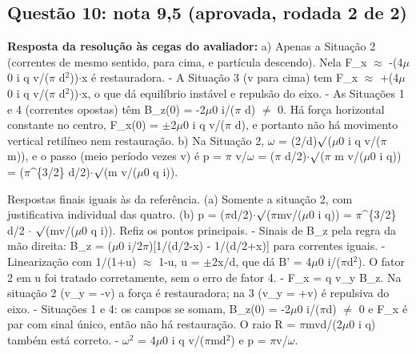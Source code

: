 \documentclass{article}%
\begin{document}
\subsection*{Questão 10: nota 9,5 (aprovada, rodada 2 de 2)}%
\textbf{Resposta da resolução às cegas do avaliador:} a) Apenas a Situação 2 (correntes de mesmo sentido, para cima, e partícula descendo). Nela F\_x $\approx$ -(4$\mu$0 i q v/($\pi$ d$^2$))$\cdot$x é restauradora.\newline%
{-} A Situação 3 (v para cima) tem F\_x $\approx$ +(4$\mu$0 i q v/($\pi$ d$^2$))$\cdot$x, o que dá equilíbrio instável e repulsão do eixo.\newline%
{-} As Situações 1 e 4 (correntes opostas) têm B\_z(0) = -2$\mu$0 i/($\pi$ d) $\neq$ 0. Há força horizontal constante no centro, F\_x(0) = $\pm$2$\mu$0 i q v/($\pi$ d), e portanto não há movimento vertical retilíneo nem restauração.\newline%
\newline%
b) Na Situação 2, $\omega$ = (2/d)$\surd$($\mu$0 i q v/($\pi$ m)), e o passo (meio período vezes v) é\newline%
p = $\pi$ v/$\omega$ = ($\pi$ d/2)$\cdot$$\surd$($\pi$ m v/($\mu$0 i q)) = ($\pi$\^{}\{3/2\} d/2)$\cdot$$\surd$(m v/($\mu$0 q i)).\par %
Respostas finais iguais às da referência. (a) Somente a situação 2, com justificativa individual das quatro. (b) p = ($\pi$d/2)$\cdot$$\surd$($\pi$mv/($\mu$0 i q)) = $\pi$\^{}\{3/2\} d/2 $\cdot$ $\surd$(mv/($\mu$0 q i)).\newline%
\newline%
Refiz os pontos principais.\newline%
{-} Sinais de B\_z pela regra da mão direita: B\_z = ($\mu$0 i/2$\pi$){[}1/(d/2-x) - 1/(d/2+x){]} para correntes iguais.\newline%
{-} Linearização com 1/(1+u) $\approx$ 1-u, u = $\pm$2x/d, que dá B' = 4$\mu$0 i/($\pi$d$^2$). O fator 2 em u foi tratado corretamente, sem o erro de fator 4.\newline%
{-} F\_x = q v\_y B\_z. Na situação 2 (v\_y = -v) a força é restauradora; na 3 (v\_y = +v) é repulsiva do eixo.\newline%
{-} Situações 1 e 4: os campos se somam, B\_z(0) = -2$\mu$0 i/($\pi$d) $\neq$ 0 e F\_x é par com sinal único, então não há restauração. O raio R = $\pi$mvd/(2$\mu$0 i q) também está correto.\newline%
{-} $\omega$$^2$ = 4$\mu$0 i q v/($\pi$md$^2$) e p = $\pi$v/$\omega$.\newline%
\end{document}
